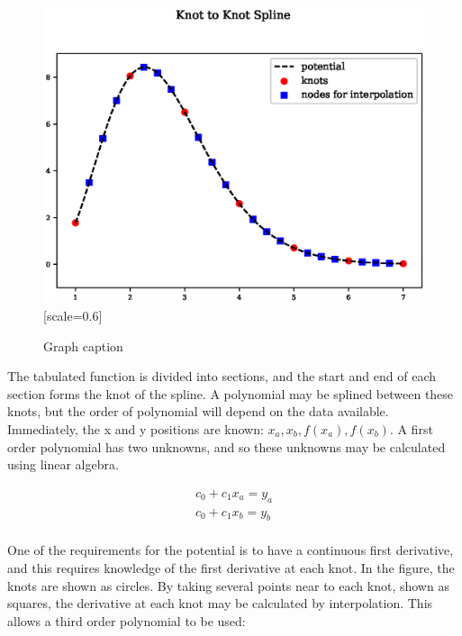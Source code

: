 \begin{figure}[h]
  \begin{center}
    \includegraphics[scale=0.70]{chapters/background_potential_fitting/plots/spline.eps}[scale=0.6]
    \caption{Graph caption}
    \label{graph:graph1}
  \end{center}
\end{figure}

The tabulated function is divided into sections, and the start and end of each section forms the knot of the spline.  A polynomial may be splined between these knots, but the order of polynomial will depend on the data available.  Immediately, the x and y positions are known: $x_a, x_b, f(x_a), f(x_b)$.  A first order polynomial has two unknowns, and so these unknowns may be calculated using linear algebra.

\begin{equation}
\begin{split}
c_0 + c_1 x_a = y_a \\
c_0 + c_1 x_b = y_b \\
\end{split}
\label{eq:cubicSpline}
\end{equation}

One of the requirements for the potential is to have a continuous first derivative, and this requires knowledge of the first derivative at each knot.  In the figure, the knots are shown as circles.  By taking several points near to each knot, shown as squares, the derivative at each knot may be calculated by interpolation.  This allows a third order polynomial to be used:


